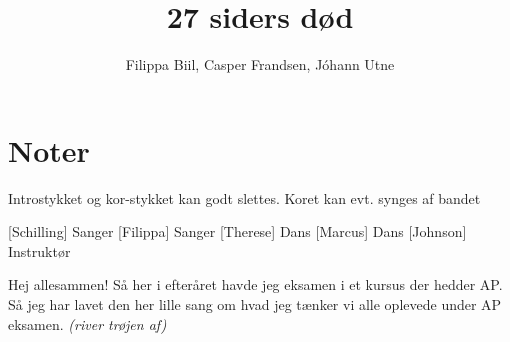 \documentclass{article}
\title{27 siders død}
\author{Filippa Biil, Casper Frandsen, Jóhann Utne}
\begin{document}
                
\maketitle
\section*{Noter}                %
Introstykket og kor-stykket kan godt slettes. Koret kan evt. synges af bandet

\begin{roles}
[Schilling] Sanger
[Filippa] Sanger
[Therese] Dans
[Marcus] Dans
[Johnson] Instruktør
\end{roles}

\begin{props}
    \prop{}
\end{props}

\newpage%
\begin{sketch}
 Hej allesammen! Så her i efteråret havde jeg eksamen i et kursus der hedder AP. Så jeg har lavet den her lille sang om hvad jeg tænker vi alle oplevede under AP eksamen.
 \textit{(river trøjen af)}
\end{sketch}

\end{document}
